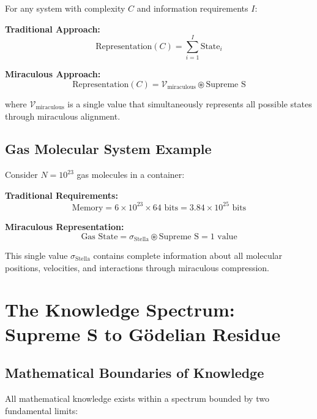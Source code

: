 \documentclass[11pt]{article}
\begin{document}
For any system with complexity $C$ and information requirements $I$:

\textbf{Traditional Approach:}
\begin{equation}
\text{Representation}(C) = \sum_{i=1}^{I} \text{State}_i
\label{eq:traditional_representation}
\end{equation}

\textbf{Miraculous Approach:}
\begin{equation}
\text{Representation}(C) = \mathcal{V}_{\text{miraculous}} \circledast \text{Supreme S}
\label{eq:miraculous_representation}
\end{equation}

where $\mathcal{V}_{\text{miraculous}}$ is a single value that simultaneously represents all possible states through miraculous alignment.

\subsection{Gas Molecular System Example}

Consider $N = 10^{23}$ gas molecules in a container:

\textbf{Traditional Requirements:}
\begin{equation}
\text{Memory} = 6 \times 10^{23} \times 64 \text{ bits} = 3.84 \times 10^{25} \text{ bits}
\label{eq:gas_traditional}
\end{equation}

\textbf{Miraculous Representation:}
\begin{equation}
\text{Gas State} = \sigma_{\text{Stella}} \circledast \text{Supreme S} = 1 \text{ value}
\label{eq:gas_miraculous}
\end{equation}

This single value $\sigma_{\text{Stella}}$ contains complete information about all molecular positions, velocities, and interactions through miraculous compression.

\section{The Knowledge Spectrum: Supreme S to Gödelian Residue}

\subsection{Mathematical Boundaries of Knowledge}

All mathematical knowledge exists within a spectrum bounded by two fundamental limits:
\end{document}
